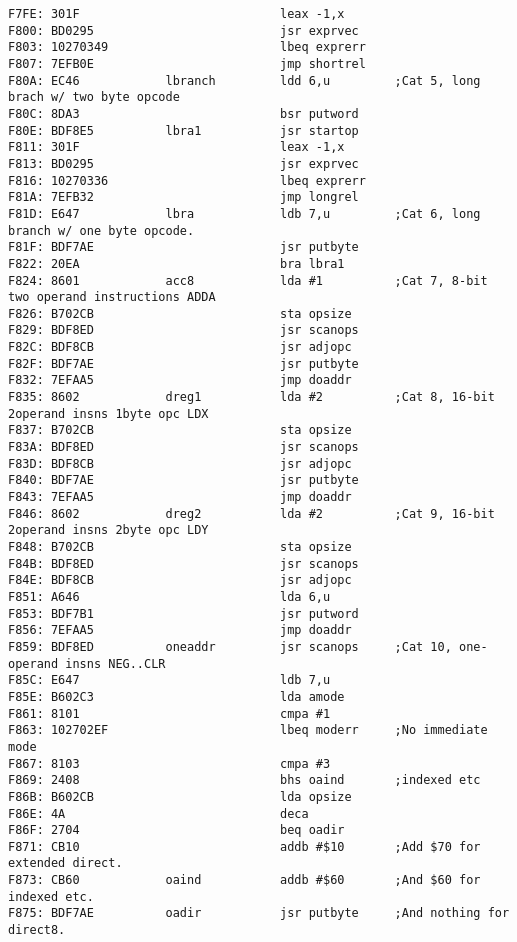 {\begin{verbatim}
F7FE: 301F                            leax -1,x
F800: BD0295                          jsr exprvec
F803: 10270349                        lbeq exprerr
F807: 7EFB0E                          jmp shortrel
F80A: EC46            lbranch         ldd 6,u         ;Cat 5, long brach w/ two byte opcode
F80C: 8DA3                            bsr putword
F80E: BDF8E5          lbra1           jsr startop
F811: 301F                            leax -1,x
F813: BD0295                          jsr exprvec
F816: 10270336                        lbeq exprerr
F81A: 7EFB32                          jmp longrel             
F81D: E647            lbra            ldb 7,u         ;Cat 6, long branch w/ one byte opcode.
F81F: BDF7AE                          jsr putbyte
F822: 20EA                            bra lbra1
F824: 8601            acc8            lda #1          ;Cat 7, 8-bit two operand instructions ADDA
F826: B702CB                          sta opsize
F829: BDF8ED                          jsr scanops
F82C: BDF8CB                          jsr adjopc
F82F: BDF7AE                          jsr putbyte
F832: 7EFAA5                          jmp doaddr
F835: 8602            dreg1           lda #2          ;Cat 8, 16-bit 2operand insns 1byte opc LDX
F837: B702CB                          sta opsize
F83A: BDF8ED                          jsr scanops
F83D: BDF8CB                          jsr adjopc
F840: BDF7AE                          jsr putbyte
F843: 7EFAA5                          jmp doaddr
F846: 8602            dreg2           lda #2          ;Cat 9, 16-bit 2operand insns 2byte opc LDY
F848: B702CB                          sta opsize
F84B: BDF8ED                          jsr scanops
F84E: BDF8CB                          jsr adjopc
F851: A646                            lda 6,u
F853: BDF7B1                          jsr putword
F856: 7EFAA5                          jmp doaddr
F859: BDF8ED          oneaddr         jsr scanops     ;Cat 10, one-operand insns NEG..CLR
F85C: E647                            ldb 7,u
F85E: B602C3                          lda amode
F861: 8101                            cmpa #1
F863: 102702EF                        lbeq moderr     ;No immediate mode
F867: 8103                            cmpa #3
F869: 2408                            bhs oaind       ;indexed etc
F86B: B602CB                          lda opsize
F86E: 4A                              deca
F86F: 2704                            beq oadir
F871: CB10                            addb #$10       ;Add $70 for extended direct.
F873: CB60            oaind           addb #$60       ;And $60 for indexed etc.
F875: BDF7AE          oadir           jsr putbyte     ;And nothing for direct8.

\end{verbatim}}
